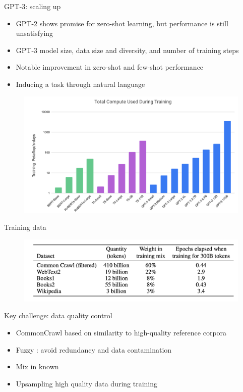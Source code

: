 \documentclass[usenames,dvipsnames,notes,11pt,aspectratio=169,hyperref={colorlinks=true, linkcolor=blue}]{beamer}
\begin{document}
\begin{frame}
    {GPT-3: scaling up}
    \begin{itemize}
        \item GPT-2 shows promise for zero-shot learning, but performance is still unsatisfying
        \item GPT-3  model size, data size and diversity, and number of training steps
        \item Notable improvement in zero-shot and few-shot performance
        \item Inducing a task through natural language  
    \end{itemize}
    \begin{figure}
        \includegraphics[height=0.6\textheight]{figures/gpt3-compute}
    \end{figure}
\end{frame}

\begin{frame}
    {Training data}
    \begin{figure}
        \includegraphics[height=0.4\textheight]{figures/gpt3-data}
    \end{figure}
Key challenge: data quality control
    \begin{itemize}
        \item {} CommonCrawl based on similarity to high-quality reference corpora 
        \item Fuzzy : avoid redundancy and data contamination
        \item Mix in known 
        \item Upsampling high quality data during training
    \end{itemize}
\end{frame}
\end{document}

